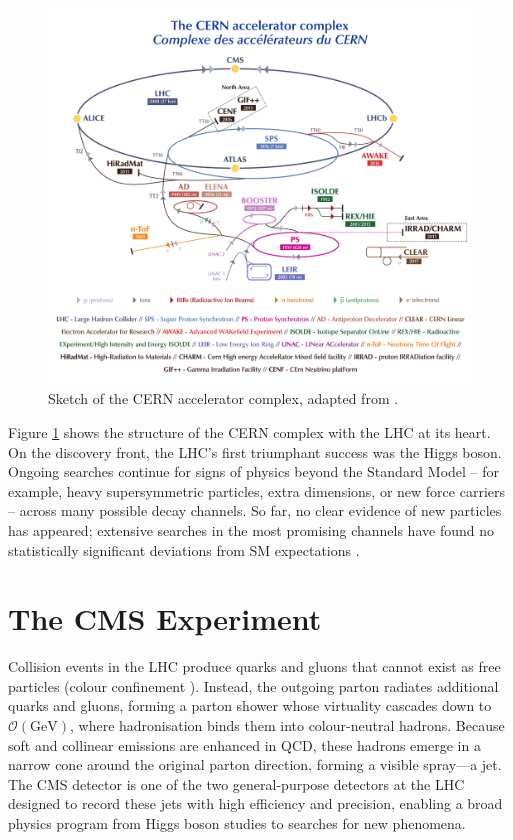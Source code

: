 \begin{figure}[h]
    \centering
    \includegraphics[width=0.9\linewidth]{media/CCC-v2018-print-v2.pdf}
    \caption{ Sketch of the CERN accelerator complex, adapted from \cite{Mobs:2636343}.}
    \label{fig:lhc}
\end{figure}

Figure \ref{fig:lhc} shows the structure of the CERN complex with the LHC at its heart. On the discovery front, the LHC’s first triumphant success was the Higgs boson. Ongoing searches continue for signs of physics beyond the Standard Model – for example, heavy supersymmetric particles, extra dimensions, or new force carriers – across many possible decay channels. So far, no clear evidence of new particles has appeared; extensive searches in the most promising channels have found no statistically significant deviations from SM expectations \cite{sonneveld2025susyhighlightscurrentresults}.

\section{The CMS Experiment}

Collision events in the LHC produce quarks and gluons that cannot exist as free particles (colour confinement \cite{pich2012standardmodelelectroweakinteractions}). Instead, the outgoing parton radiates additional quarks and gluons, forming a parton shower whose virtuality cascades down to $\mathcal{O}(\mathrm{GeV})$, where hadronisation binds them into colour-neutral hadrons. Because soft and collinear emissions are enhanced in QCD, these hadrons emerge in a narrow cone around the original parton direction, forming a visible spray—a jet. The CMS detector is one of the two general-purpose detectors at the LHC designed to record these jets with high efficiency and precision, enabling a broad physics program from Higgs boson studies to searches for new phenomena. 


